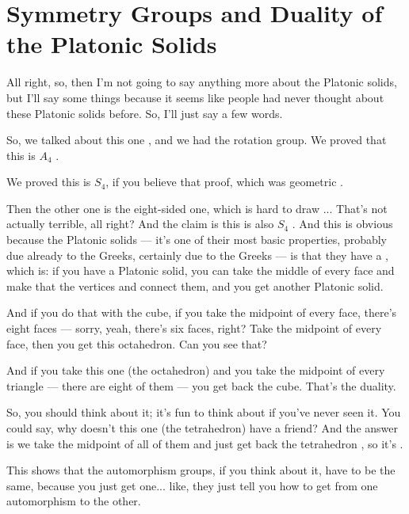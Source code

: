 \section{Symmetry Groups and Duality of the Platonic Solids}

\begin{speech}[00:21:48 - 00:23:24]
All right, so, then I'm not going to say anything more about the Platonic solids, but I'll say some things because it seems like people had never thought about these Platonic solids before. So, I'll just say a few words.

So, we talked about this one , and we had the rotation group. We proved that this is $A_4$ .

We proved this  is $S_4$, if you believe that proof, which was geometric .

Then the other one is the eight-sided one, which is hard to draw ... That's not actually terrible, all right? And the claim is this is also $S_4$ . And this is obvious because the Platonic solids --- it's one of their most basic properties, probably due already to the Greeks, certainly due to the Greeks --- is that they have a , which is: if you have a Platonic solid, you can take the middle of every face  and make that the vertices and connect them, and you get another Platonic solid.

And if you do that with the cube, if you take the midpoint of every face, there's eight faces --- sorry, yeah, there's six faces, right? Take the midpoint of every face, then you get this octahedron. Can you see that?

And if you take this one (the octahedron) and you take the midpoint of every triangle --- there are eight of them --- you get back the cube. That's the duality.

So, you should think about it; it's fun to think about if you've never seen it. You could say, why doesn't this one (the tetrahedron) have a friend? And the answer is we take the midpoint of all of them and just get back the tetrahedron , so it's .

This shows that the automorphism groups, if you think about it, have to be the same, because you just get one... like, they just tell you how to get from one automorphism to the other.
\end{speech}

